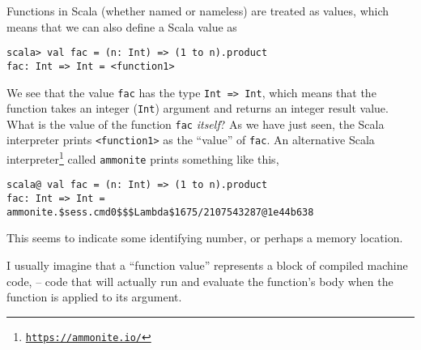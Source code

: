Functions in Scala (whether named or nameless) are treated as values,
which means that we can also define a Scala value as
\begin{lstlisting}
scala> val fac = (n: Int) => (1 to n).product
fac: Int => Int = <function1>
\end{lstlisting}
We see that the value \lstinline!fac!
has the type \lstinline!Int => Int!,
which means that the function takes an integer (\lstinline!Int!)
argument and returns an integer result value. What is the value of
the function \lstinline!fac!
\emph{itself}? As we have just seen, the Scala interpreter prints
\lstinline!<function1>!
as the ``value'' of \lstinline!fac!.
An alternative Scala interpreter\footnote{\texttt{\href{https://ammonite.io/}{https://ammonite.io/}}}
called \texttt{ammonite} prints something like this,
\begin{lstlisting}
scala@ val fac = (n: Int) => (1 to n).product
fac: Int => Int = ammonite.$sess.cmd0$$$Lambda$1675/2107543287@1e44b638
\end{lstlisting}
This seems to indicate some identifying number, or perhaps a memory
location.

I usually imagine that a ``function value'' represents a block\emph{
}of compiled machine code,  –  code that will actually run and evaluate
the function's body when the function is applied to its argument.

